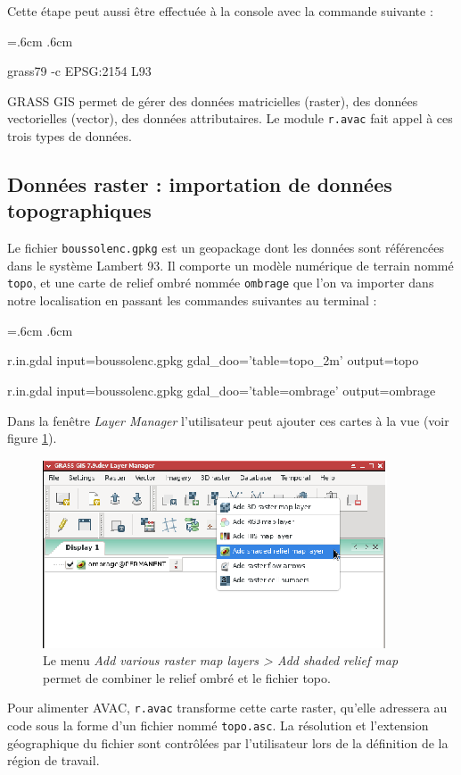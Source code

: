 \documentclass[12pt,oneside]{paper}
\newenvironment{code}{%
\vspace{2mm}%
\hangindent=.6cm%
\parindent.6cm%
\ttfamily%
\color{gris.3}%
}{
\vspace{2mm}%
}
\begin{document}
Cette étape peut aussi être effectuée à la console avec la commande suivante :

\begin{code}
grass79 -c EPSG:2154 L93
\end{code}

GRASS GIS permet de gérer des données matricielles (raster), des données vectorielles (vector), des données attributaires. Le module \verb+r.avac+ fait appel à ces trois types de données.

\subsection{Données raster : importation de données topographiques}
Le fichier \texttt{boussolenc.gpkg} est un geopackage dont les données sont référencées dans le système Lambert 93. Il comporte un modèle numérique de terrain nommé \texttt{topo}, et une carte de relief ombré nommée \texttt{ombrage} que l'on va importer dans notre localisation en passant les commandes suivantes au terminal :

\begin{code}
r.in.gdal input=boussolenc.gpkg gdal\_doo='table=topo\_2m' output=topo

r.in.gdal input=boussolenc.gpkg gdal\_doo='table=ombrage' output=ombrage
\end{code}

Dans la fenêtre \emph{Layer Manager} l'utilisateur peut ajouter ces cartes à la vue (voir figure \ref{fig:shade}).

\begin{figure}[!h]
\begin{center}
\includegraphics[width=0.70\hsize]{capture3.eps}
\caption{Le menu \emph{Add various raster map layers > Add shaded relief map} permet de combiner le relief ombré et le fichier topo.}
\label{fig:shade}
\end{center}
\end{figure}

Pour alimenter AVAC, \verb+r.avac+ transforme cette carte raster, qu'elle adressera au code sous la forme d'un fichier nommé \texttt{topo.asc}. La résolution et l'extension géographique du fichier sont contrôlées par l'utilisateur lors de la définition de la région de travail.
\end{document}
